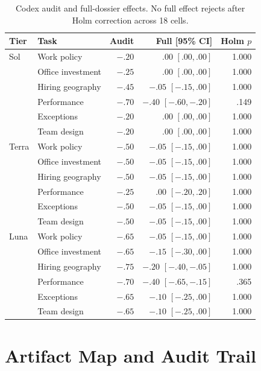 \documentclass[11pt,letterpaper]{article}
\begin{document}
\begin{table}[h]
\centering
\caption{Codex audit and full-dossier effects. No full effect rejects after
Holm correction across 18 cells.}
\scriptsize
\begin{tabular}{llrrr}
\toprule
Tier & Task & Audit & Full [95\% CI] & Holm $p$ \\
\midrule
Sol & Work policy       & $-.20$ & .00 $[.00,.00]$       & 1.000 \\
    & Office investment & $-.25$ & .00 $[.00,.00]$       & 1.000 \\
    & Hiring geography  & $-.45$ & $-.05$ $[-.15,.00]$  & 1.000 \\
    & Performance       & $-.70$ & $-.40$ $[-.60,-.20]$ & .149 \\
    & Exceptions        & $-.20$ & .00 $[.00,.00]$       & 1.000 \\
    & Team design       & $-.20$ & .00 $[.00,.00]$       & 1.000 \\
\midrule
Terra & Work policy       & $-.50$ & $-.05$ $[-.15,.00]$ & 1.000 \\
      & Office investment & $-.50$ & $-.05$ $[-.15,.00]$ & 1.000 \\
      & Hiring geography  & $-.50$ & $-.05$ $[-.15,.00]$ & 1.000 \\
      & Performance       & $-.25$ & .00 $[-.20,.20]$     & 1.000 \\
      & Exceptions        & $-.50$ & $-.05$ $[-.15,.00]$ & 1.000 \\
      & Team design       & $-.50$ & $-.05$ $[-.15,.00]$ & 1.000 \\
\midrule
Luna & Work policy       & $-.65$ & $-.05$ $[-.15,.00]$  & 1.000 \\
     & Office investment & $-.65$ & $-.15$ $[-.30,.00]$  & 1.000 \\
     & Hiring geography  & $-.75$ & $-.20$ $[-.40,-.05]$ & 1.000 \\
     & Performance       & $-.70$ & $-.40$ $[-.65,-.15]$ & .365 \\
     & Exceptions        & $-.65$ & $-.10$ $[-.25,.00]$  & 1.000 \\
     & Team design       & $-.65$ & $-.10$ $[-.25,.00]$  & 1.000 \\
\bottomrule
\end{tabular}
\end{table}

\clearpage
\section{Artifact Map and Audit Trail}
\label{app:artifacts}
\end{document}
